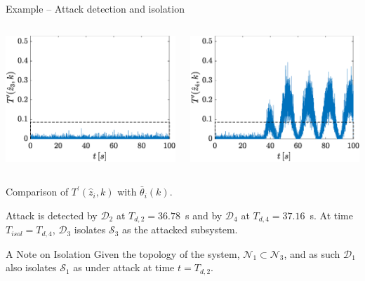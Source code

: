 \documentclass[presentation]{beamer}
\begin{document}
\begin{frame}{Example -- Attack detection and isolation}
\begin{columns}
\begin{column}{0.25\linewidth}
			\includegraphics[width=\linewidth]{fig/det3_okThr.eps}
		\end{column}
		\begin{column}{0.25\linewidth}
			\includegraphics[width=\linewidth]{fig/det4_okThr.eps}
		\end{column}
	\end{columns}
	\begin{center}
	    Comparison of $T^\prime(\hat{z}_i,k)$ with $\bar{\theta}_i(k)$.
	\end{center}
	
	
	\vfill
	Attack is detected by $\mathcal D_2$ at $T_{d,2} = 36.78$~s and by $\mathcal D_4$ at $T_{d,4} = 37.16$~s. 
	At time $T_{isol} = T_{d,4}$, $\mathcal{D}_3$ isolates $\mathcal S_3$ as the attacked subsystem.
	
	\begin{block}{A Note on Isolation}
	    Given the topology of the system, $\mathcal N_1 \subset \mathcal N_3$, and as such $\mathcal D_1$ also isolates $\mathcal{S}_1$ as under attack at time $t = T_{d,2}$.
	\end{block}
\end{frame}
\end{document}
